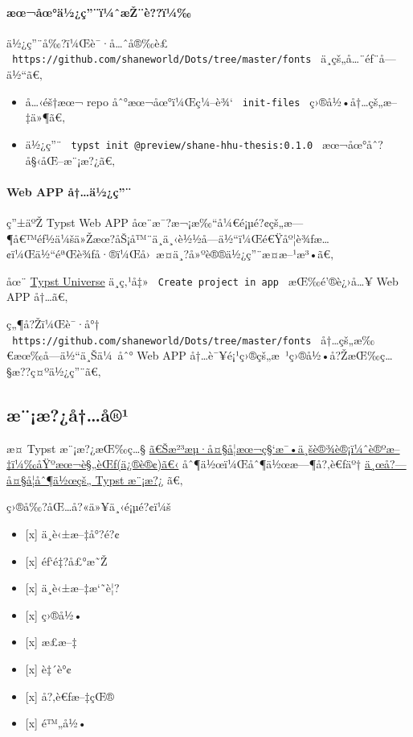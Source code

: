 \paragraph{æœ¬åœ°ä½¿ç''¨ï¼ˆæŽ¨è??ï¼‰}\label{uxe6ux153uxe5ux153uxe4uxbduxe7uxefuxbcux2c6uxe6ux17euxe8uxefuxbc}

ä½¿ç''¨å‰?ï¼Œè¯·å\ldots ˆå®‰è£
\texttt{\ https://github.com/shaneworld/Dots/tree/master/fonts\ }
ä¸­çš„å\ldots¨éƒ¨å­---ä½``ã€‚

\begin{itemize}
\item
  å\ldots‹éš†æœ¬ repo åˆ°æœ¬åœ°ï¼Œç¼--è¾` \texttt{\ init-files\ }
  ç›®å½•å†\ldots çš„æ--‡ä»¶ã€‚
\item
  ä½¿ç''¨ \texttt{\ typst\ init\ @preview/shane-hhu-thesis:0.1.0\ }
  æœ¬åœ°åˆ?å§‹åŒ--æ¨¡æ?¿ã€‚
\end{itemize}

\paragraph{Web APP å†\ldots ä½¿ç''¨}\label{web-app-uxe5uxe4uxbduxe7}

ç''±äºŽ Typst Web APP
åœ¨æ¯?æ¬¡æ‰``å¼€é¡µé?¢çš„æ---¶å€™éƒ½ä¼šä»Žæœ?åŠ¡å™¨ä¸­ä¸‹è½½å­---ä½``ï¼Œé€Ÿåº¦è¾ƒæ\ldots¢ï¼Œä½``éªŒè¾ƒå·®ï¼Œå›~æ­¤ä¸?å»ºè®®ä½¿ç''¨æ­¤æ--¹æ³•ã€‚

åœ¨ \href{https://typst.app/universe/package/shane-hhu-thesis}{Typst
Universe} ä¸­ç‚¹å‡» \texttt{\ Create\ project\ in\ app\ }
æŒ‰é'®è¿›å\ldots¥ Web APP å†\ldots ã€‚

ç„¶å?Žï¼Œè¯·å°†
\texttt{\ https://github.com/shaneworld/Dots/tree/master/fonts\ }
å†\ldots çš„æ‰€æœ‰å­---ä½``ä¸Šä¼~åˆ° Web APP
å†\ldots è¯¥é¡¹ç›®çš„æ~¹ç›®å½•å?ŽæŒ‰ç\ldots§æ??ç¤ºä½¿ç''¨ã€‚

\subsection{æ¨¡æ?¿å†\ldots å®¹}\label{uxe6uxe6uxe5uxe5uxb9}

æ­¤ Typst æ¨¡æ?¿æŒ‰ç\ldots§
\href{https://bylw.hhu.edu.cn/UpLoadFile/83cd5f1169974a0db06d865c7ee11af4.pdf}{ã€Šæ²³æµ·å¤§å­¦æœ¬ç§`æ¯•ä¸šè®¾è®¡ï¼ˆè®ºæ--‡ï¼‰åŸºæœ¬è§„èŒƒ(ä¿®è®¢)ã€‹}
åˆ¶ä½œï¼Œåˆ¶ä½œæ---¶å?‚è€ƒäº†
\href{https://github.com/csimide/SEU-Typst-Template}{ä¸œå?---å¤§å­¦åˆ¶ä½œçš„
Typst æ¨¡æ?¿} ã€‚

ç›®å‰?åŒ\ldots å?«ä»¥ä¸‹é¡µé?¢ï¼š

\begin{itemize}
\tightlist
\item
  {[}x{]} ä¸­è‹±æ--‡å°?é?¢
\item
  {[}x{]} éƒ`é‡?å£°æ˜Ž
\item
  {[}x{]} ä¸­è‹±æ--‡æ`˜è¦?
\item
  {[}x{]} ç›®å½•
\item
  {[}x{]} æ­£æ--‡
\item
  {[}x{]} è‡´è°¢
\item
  {[}x{]} å?‚è€ƒæ--‡çŒ®
\item
  {[}x{]} é™„å½•
\end{itemize}

